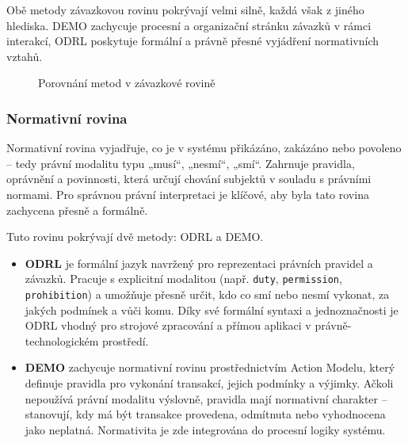 Obě metody závazkovou rovinu pokrývají velmi silně, každá však z jiného hlediska. DEMO zachycuje procesní a organizační stránku závazků v rámci interakcí, ODRL poskytuje formální a právně přesné vyjádření normativních vztahů. 

\begin{figure}[H]
  \centering
  \caption{Porovnání metod v závazkové rovině}
\end{figure}



\subsubsection{Normativní rovina}
\label{sec:normativni-rovina}

Normativní rovina vyjadřuje, co je v systému přikázáno, zakázáno nebo povoleno – tedy právní modalitu typu „musí“, „nesmí“, „smí“. Zahrnuje pravidla, oprávnění a povinnosti, která určují chování subjektů v souladu s právními normami. Pro správnou právní interpretaci je klíčové, aby byla tato rovina zachycena přesně a formálně.

Tuto rovinu pokrývají dvě metody: ODRL a DEMO.

\begin{itemize}
  \item \textbf{ODRL} je formální jazyk navržený pro reprezentaci právních pravidel a závazků. Pracuje s explicitní modalitou (např. \texttt{duty}, \texttt{permission}, \texttt{prohibition}) a umožňuje přesně určit, kdo co smí nebo nesmí vykonat, za jakých podmínek a vůči komu. Díky své formální syntaxi a jednoznačnosti je ODRL vhodný pro strojové zpracování a přímou aplikaci v právně-technologickém prostředí.

  \item \textbf{DEMO} zachycuje normativní rovinu prostřednictvím Action Modelu, který definuje pravidla pro vykonání transakcí, jejich podmínky a výjimky. Ačkoli nepoužívá právní modalitu výslovně, pravidla mají normativní charakter – stanovují, kdy má být transakce provedena, odmítnuta nebo vyhodnocena jako neplatná. Normativita je zde integrována do procesní logiky systému.
\end{itemize}

